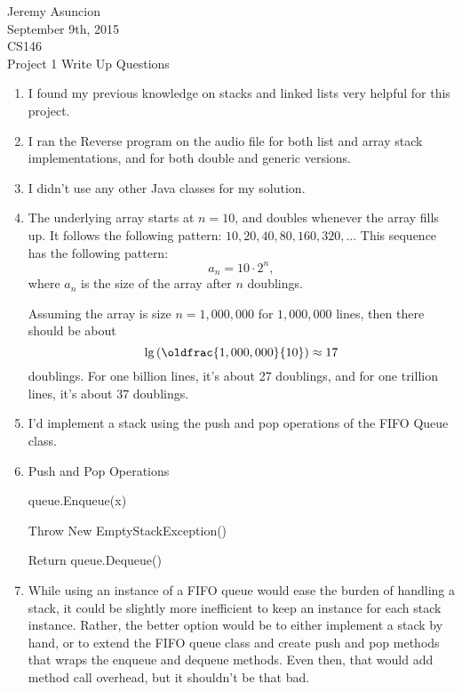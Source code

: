\documentclass[12pt, oneside, letter]{article}
\renewcommand*{\frac}[2]{\oldfrac{\displaystyle #1}{\displaystyle #2}}
\newcommand{\eq}[1]{$\displaystyle #1$} %
\newcommand{\equ}[1]{\begin{equation*}#1\end{equation*}} %
\newcommand{\env}[2]{
    \begin{#1}
        #2
    \end{#1}
}
\begin{document}
    
    \flushright
    Jeremy Asuncion \\
    September 9th, 2015 \\
    CS146 \\
    Project 1 Write Up Questions

    \flushleft
    \env{enumerate} {
        \item
            I found my previous knowledge on stacks and linked lists very helpful for this project.

        \item
            I ran the Reverse program on the audio file for both list and array stack implementations, and for
            both double and generic versions.

        \item
            I didn't use any other Java classes for my solution.

        \item
            The underlying array starts at \eq{n = 10}, and doubles whenever the array fills up. It follows
            the following pattern: \eq{10, 20, 40, 80, 160, 320,...} This sequence has the following pattern:
            \equ {
                a_n = 10 \cdot 2^n,
            }
            where \eq{a_n} is the size of the array after \eq{n} doublings.

            Assuming the array is size \eq{n = 1,000,000} for \eq{1,000,000} lines, then there should be about
            \equ{
                \lg\left( \frac{1,000,000}{10} \right) \approx 17
            }
            doublings. For one billion lines, it's about 27 doublings, and for one trillion lines, it's about
            37 doublings.

        \item
            I'd implement a stack using the push and pop operations of the FIFO Queue class.

        \item
            \env{algorithm} {
                \caption{Push and Pop Operations}

                \env{algorithmic} {
                    \Procedure{Push}{Item x}
                        \State queue.Enqueue(x)
                    \EndProcedure

                    \Procedure{Pop}{} 
                        \If{queue.IsEmpty()}
                            \State Throw New EmptyStackException()
                        \EndIf

                        \State Return queue.Dequeue()
                    \EndProcedure
                }
            }

        \item
            While using an instance of a FIFO queue would ease the burden of handling a stack,
            it could be slightly more inefficient to keep an instance for each stack instance.
            Rather, the better option would be to either implement a stack by hand, or to
            extend the FIFO queue class and create push and pop methods 
            that wraps the enqueue and dequeue methods. Even then,
            that would add method call overhead, but it shouldn't be that bad.
    }    
    
\end{document}
